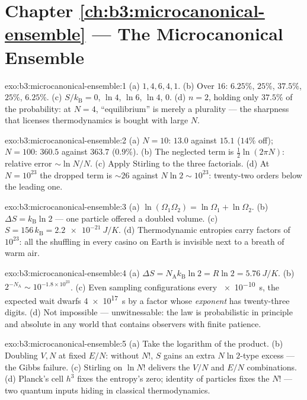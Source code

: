 \section*{Chapter \ref{ch:b3:microcanonical-ensemble} --- The Microcanonical Ensemble}

\begin{solution}{exo:b3:microcanonical-ensemble:1}
(a) $1, 4, 6, 4, 1$. (b) Over $16$: $6.25\%$, $25\%$, $37.5\%$,
$25\%$, $6.25\%$. (c) $S/k_{\text{B}} = 0$, $\ln4$, $\ln6$, $\ln4$,
$0$. (d) $n = 2$, holding only $37.5\%$ of the probability: at
$N = 4$, ``equilibrium'' is merely a plurality --- the sharpness
that licenses thermodynamics is bought with large $N$.
\end{solution}

\begin{solution}{exo:b3:microcanonical-ensemble:2}
(a) $N = 10$: $13.0$ against $15.1$ ($14\%$ off); $N = 100$:
$360.5$ against $363.7$ ($0.9\%$). (b) The neglected term is
$\tfrac12\ln(2\pi N)$: relative error $\sim\ln N/N$. (c) Apply
Stirling to the three factorials. (d) At $N = 10^{23}$ the dropped
term is $\sim26$ against $N\ln2 \sim 10^{23}$: twenty-two orders
below the leading one.
\end{solution}

\begin{solution}{exo:b3:microcanonical-ensemble:3}
(a) $\ln(\Omega_1\Omega_2) = \ln\Omega_1 + \ln\Omega_2$. (b)
$\Delta S = k_{\text{B}}\ln2$ --- one particle offered a doubled
volume. (c) $S = 156\,k_{\text{B}} = \qty{2.2e-21}{J/K}$. (d)
Thermodynamic entropies carry factors of $10^{23}$: all the
shuffling in every casino on Earth is invisible next to a breath
of warm air.
\end{solution}

\begin{solution}{exo:b3:microcanonical-ensemble:4}
(a) $\Delta S = N_{\text{A}}k_{\text{B}}\ln2 = R\ln2 =
\qty{5.76}{J/K}$. (b) $2^{-N_{\text{A}}} \sim 10^{-1.8\times
10^{23}}$. (c) Even sampling configurations every \qty{e-10}{s},
the expected wait dwarfs \qty{4e17}{s} by a factor whose
\emph{exponent} has twenty-three digits. (d) Not impossible ---
unwitnessable: the law is probabilistic in principle and absolute
in any world that contains observers with finite patience.
\end{solution}

\begin{solution}{exo:b3:microcanonical-ensemble:5}
(a) Take the logarithm of the product. (b) Doubling $V, N$ at
fixed $E/N$: without $N!$, $S$ gains an extra $N\ln2$-type excess
--- the Gibbs failure. (c) Stirling on $\ln N!$ delivers the
$V/N$ and $E/N$ combinations. (d) Planck's cell $h^3$ fixes the
entropy's zero; identity of particles fixes the $N!$ --- two
quantum inputs hiding in classical thermodynamics.
\end{solution}

